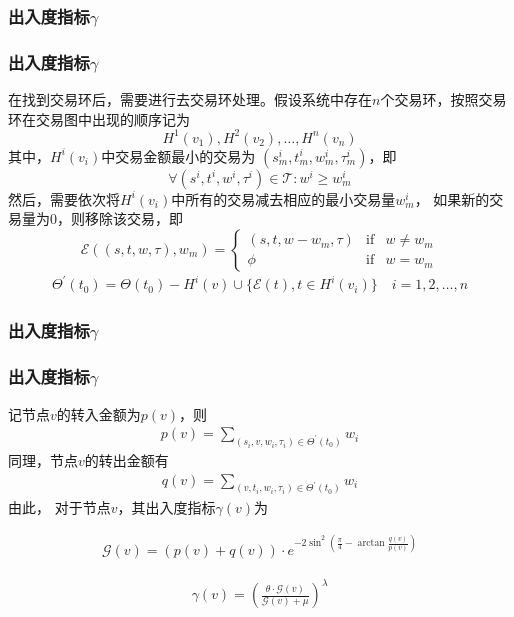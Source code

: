 \begin{frame}
\frametitle{出入度指标$\gamma$}

\end{frame}

\begin{frame}
\frametitle{出入度指标$\gamma$}
在找到交易环后，需要进行去交易环处理。假设系统中存在$n$个交易环，按照交易环在交易图中出现的顺序记为
\[
H^1(v_1), H^2(v_2), \dots, H^n(v_n)\]
\noindent 其中，$H^i(v_i)$中交易金额最小的交易为 $(s^i_m, t^i_m, w^i_m, \tau^i_m)$，即
\[
\forall (s^i, t^i, w^i, \tau^i) \in \mathcal{T} : w^i \ge w^i_m
\]
\noindent 然后，需要依次将$H^i(v_i)$中所有的交易减去相应的最小交易量$w^i_m$，
如果新的交易量为0，则移除该交易，即
\[
\mathcal{E}((s, t, w, \tau), w_m) = \left\{ \begin{array}{rcl}
(s, t, w-w_m, \tau) & \mbox{if} & w \ne w_m \\
\phi & \mbox{if} & w = w_m
\end{array}\right.
\]
\begin{align}
\Theta^{\prime}(t_0)=\Theta(t_0)-H^i(v) \cup \{\mathcal{E}(t), t\in H^i(v_i)\} \quad i = 1, 2,\dots, n
\end{align}
\end{frame}

\begin{frame}
\frametitle{出入度指标$\gamma$}

\end{frame}

\begin{frame}
\frametitle{出入度指标$\gamma$}
记节点$v$的转入金额为$p(v)$，则
\begin{align}
p(v) = \sum_{(s_i, v, w_i, \tau_i) \in \Theta^{\prime}(t_0)}{w_i}
\end{align}
\noindent 同理，节点$v$的转出金额有
\begin{align}
q(v) = \sum_{(v, t_i, w_i, \tau_i) \in \Theta^{\prime}(t_0)}{w_i}
\end{align}
\noindent 由此，
对于节点$v$，其出入度指标$\gamma(v)$为

\begin{align}
\mathcal{G}(v) = (p(v) + q(v)) \cdot e^{-2\sin^2{(\frac{\pi}{4} - \arctan\frac{q(v)}{p(v)})}}
\end{align}

\begin{align}
\gamma(v) = (\frac{\theta\cdot \mathcal{G}(v)}{\mathcal{G}(v) + \mu})^{\lambda}
\end{align}
\end{frame}

